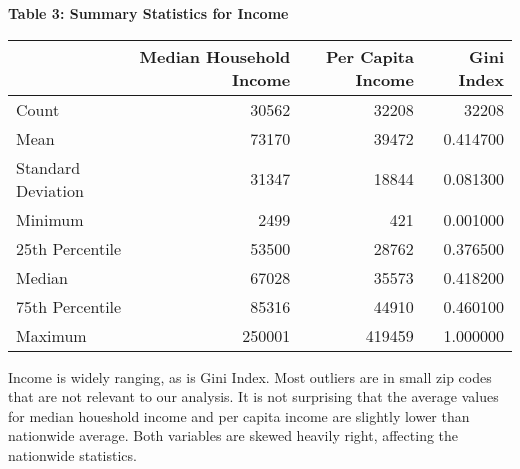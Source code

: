 \documentclass[11pt]{article}
\begin{document}
\begin{table}[H]
    \centering
    \textbf{Table 3: Summary Statistics for Income}\\
    \begin{tabular}{l|rrr}
        \toprule
        & Median Household Income & Per Capita Income & Gini Index \\\midrule
       Count & 30562 & 32208 & 32208 \\
       Mean & 73170 & 39472 & 0.414700 \\
       Standard Deviation & 31347 & 18844 & 0.081300 \\
       Minimum & 2499 & 421 & 0.001000 \\
       25th Percentile & 53500 & 28762 & 0.376500 \\
       Median & 67028 & 35573 & 0.418200 \\
       75th Percentile & 85316 & 44910 & 0.460100 \\
       Maximum & 250001 & 419459 & 1.000000 \\\bottomrule
       \end{tabular}
\end{table}
Income is widely ranging, as is Gini Index. Most outliers are in small zip codes that are not relevant to our analysis. It is not surprising that the average values for median houeshold income and per capita income are slightly lower than nationwide average. Both variables are skewed heavily right, affecting the nationwide statistics.
\end{document}
